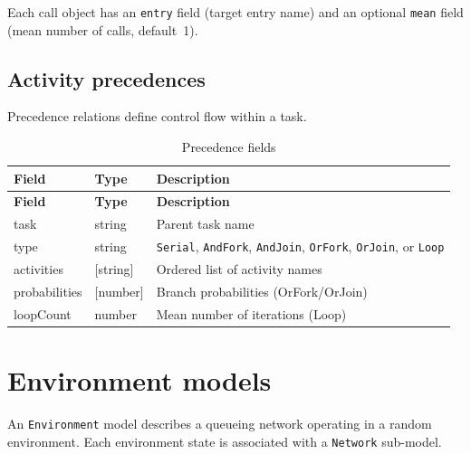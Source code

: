 \noindent Each call object has an \texttt{entry} field (target entry name) and an optional \texttt{mean} field (mean number of calls, default~1).

\subsection{Activity precedences}
\label{json:lqn-prec}

Precedence relations define control flow within a task.

\begin{footnotesize}
\begin{longtable}{|T{2.2cm}|T{2.5cm}|D{8.2cm}|}
\caption{Precedence fields}\label{tab:json-prec}
\\\hline
\textbf{Field} & \textbf{Type} & \textbf{Description} \\\hline
\endfirsthead
\hline \textbf{Field} & \textbf{Type} & \textbf{Description} \\\hline
\endhead
\hline
\endfoot
task         & string & Parent task name \\\hline
type         & string & \texttt{Serial}, \texttt{AndFork}, \texttt{AndJoin}, \texttt{OrFork}, \texttt{OrJoin}, or \texttt{Loop} \\\hline
activities   & [string] & Ordered list of activity names \\\hline
probabilities & [number] & Branch probabilities (OrFork/OrJoin) \\\hline
loopCount    & number & Mean number of iterations (Loop) \\\hline
\end{longtable}
\end{footnotesize}

\section{Environment models}
\label{json:environment}

An \texttt{Environment} model describes a queueing network operating in a random environment. Each environment state is associated with a \texttt{Network} sub-model.

